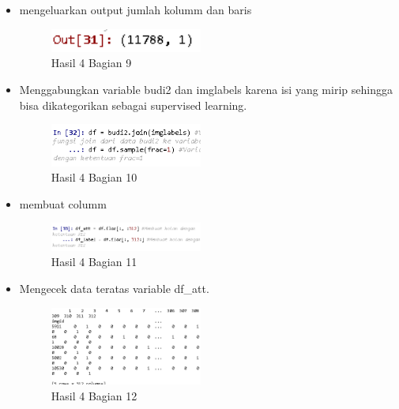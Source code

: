 \begin{itemize}
\item mengeluarkan output jumlah kolumm dan baris

\begin{figure}[H]
\centerline{\includegraphics[width=5cm]{figures/1174089/3/praktek11.PNG}}
\caption{Hasil 4 Bagian 9}
\label{labelgambar}
\end{figure}

\item Menggabungkan variable budi2 dan imglabels karena isi yang mirip sehingga bisa dikategorikan sebagai supervised learning.

\begin{figure}[H]
\centerline{\includegraphics[width=5cm]{figures/1174089/3/praktek12.PNG}}
\caption{Hasil 4 Bagian 10}
\label{labelgambar}
\end{figure}

\item membuat columm

\begin{figure}[H]
\centerline{\includegraphics[width=5cm]{figures/1174089/3/praktek13.PNG}}
\caption{Hasil 4 Bagian 11}
\label{labelgambar}
\end{figure}

\item Mengecek data teratas variable df\_att.

\begin{figure}[H]
\centerline{\includegraphics[width=5cm]{figures/1174089/3/praktek14.PNG}}
\caption{Hasil 4 Bagian 12}
\label{labelgambar}
\end{figure}


\end{itemize}
